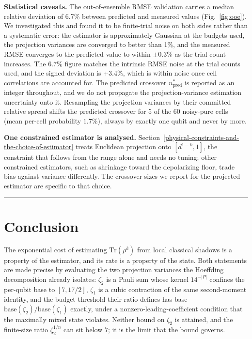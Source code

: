 \documentclass[a4paper,superscriptaddress,nofootinbib,onecolumn,nopdfoutputerror]{quantumarticle}
\begin{document}
\textbf{Statistical caveats.} The out-of-ensemble RMSE validation
carries a median relative deviation of 6.7\% between predicted and
measured values (Fig.~\ref{fig:ooe}). We investigated this and found it to be finite-trial
noise on both sides rather than a systematic error: the estimator is
approximately Gaussian at the budgets used, the projection variances are
converged to better than 1\%, and the measured RMSE converges to the
predicted value to within \(\pm 0.3\%\) as the trial count increases.
The 6.7\% figure matches the intrinsic RMSE noise at the trial counts
used, and the signed deviation is +3.4\%, which is within noise once
cell correlations are accounted for. The predicted crossover
\(n^*_{\text{pred}}\) is reported as an integer throughout, and we do not
propagate the projection-variance estimation uncertainty onto it.
Resampling the projection variances by their committed relative spread
shifts the predicted crossover for \(5\) of the \(60\) noisy-pure cells
(mean per-cell probability \(1.7\%\)), always by exactly one qubit and
never by more.

\textbf{One constrained estimator is analysed.}
Section~\ref{physical-constraints-and-the-choice-of-estimator} treats
Euclidean projection onto \([d^{1-k}, 1]\), the constraint that follows
from the range alone and needs no tuning; other constrained estimators,
such as shrinkage toward the depolarizing floor, trade bias against
variance differently. The crossover sizes we report for the projected
estimator are specific to that choice.


\begin{center}\rule{0.5\linewidth}{0.5pt}\end{center}

\hypertarget{conclusion}{%
\section{Conclusion}\label{conclusion}}

The exponential cost of estimating \(\mathrm{Tr}(\rho^k)\) from local classical shadows is a
property of the estimator, and its rate is a property of the state. Both statements are made
precise by evaluating the two projection variances the Hoeffding decomposition already isolates:
\(\zeta_2\) is a Pauli sum whose kernel \(14^{-|P|}\) confines the per-qubit base to
\([7, 17/2]\), \(\zeta_1\) is a cubic contraction of the same second-moment identity, and the
budget threshold their ratio defines has base \(\mathrm{base}(\zeta_2)/\mathrm{base}(\zeta_1)\)
exactly, under a nonzero-leading-coefficient condition that the maximally mixed state violates.
Neither bound on \(\zeta_2\) is attained, and the finite-size ratio \(\zeta_2^{1/n}\) can sit
below \(7\); it is the limit that the bound governs.
\end{document}
